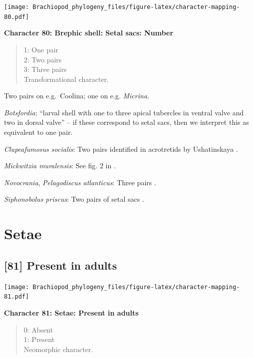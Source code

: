 \documentclass[openany]{book}
\theoremstyle{definition}
\theoremstyle{definition}
\theoremstyle{definition}
\theoremstyle{remark}
\begin{document}
\texttt{[image: Brachiopod\_phylogeny\_files/figure-latex/character-mapping-80.pdf]}

\textbf{Character 80: Brephic shell: Setal sacs: Number}

\begin{quote}
1: One pair\\
2: Two pairs\\
3: Three pairs\\
Transformational character.
\end{quote}

Two pairs on e.g.~Coolina; one on e.g. \emph{Micrina}.

\hypertarget{Botsfordia-coding-80}{}
\emph{Botsfordia}: ``larval shell with one to three apical tubercles in
ventral valve and two in dorsal valve''
\citep{Williams2000LinguliformeaCraniiformea} -- if these correspond to
setal sacs, then we interpret this as equivalent to one pair.

\hypertarget{Clupeafumosus_socialis-coding-80}{}
\emph{Clupeafumosus socialis}: Two pairs identified in acrotretids by
Ushatinskaya \citeyearpar{Ushatinskaya2016Protegulumand}.

\hypertarget{Mickwitzia_muralensis-coding-80}{}
\emph{Mickwitzia muralensis}: See fig. 2 in
\citet{Balthasar2009Thebrachiopod}.

\hypertarget{Novocrania-coding-80}{}
\emph{Novocrania}, \emph{Pelagodiscus atlanticus}: Three pairs
\citep{Carlson1995Phylogeneticrelationships}.

\hypertarget{Siphonobolus_priscus-coding-80}{}
\emph{Siphonobolus priscus}: Two pairs of setal sacs
\citep{Popov2009Earlyontogeny}.

\section{Setae}\label{setae}

\subsection*{{[}81{]} Present in adults}\label{present-in-adults}

\texttt{[image: Brachiopod\_phylogeny\_files/figure-latex/character-mapping-81.pdf]}

\textbf{Character 81: Setae: Present in adults}

\begin{quote}
0: Absent\\
1: Present\\
Neomorphic character.
\end{quote}
\end{document}
